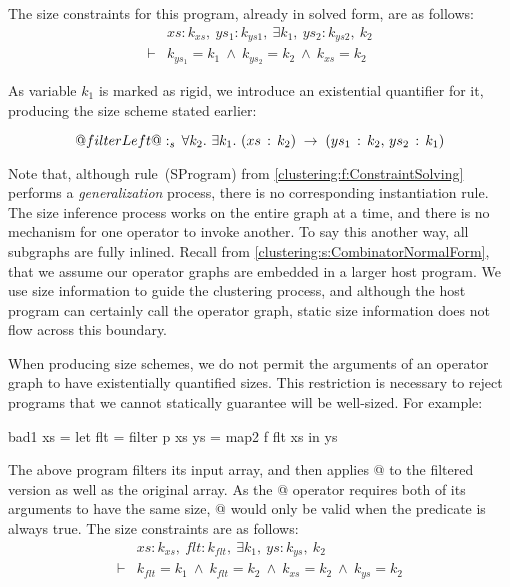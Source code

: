 The size constraints for this program, already in solved form, are as follows:
$$
\begin{array}{ll}
       & xs : k_{xs},~ ys_1 : k_{ys1},~ \exists k_1,~ ys_2 : k_{ys2},~ k_2
\\
\vdash &          k_{ys_1} = k_1
        ~\wedge~  k_{ys_2} = k_2
        ~\wedge~  k_{xs}   = k_2
\end{array}
$$

As variable $k_1$ is marked as rigid, we introduce an existential quantifier for it, producing the size scheme stated earlier:

$$
@filterLeft@ :\sb{s}\,\forall k\sb{2}.\ \exists k\sb{1}.\ (xs\,:\,k\sb{2})\;\to\;(ys\sb{1}\,:\,k\sb{2},\,ys\sb{2}\,:\,k\sb{1})
$$

Note that, although rule~(SProgram) from \cref{clustering:f:ConstraintSolving} performs a \emph{generalization} process, there is no corresponding instantiation rule. The size inference process works on the entire graph at a time, and there is no mechanism for one operator to invoke another. To say this another way, all subgraphs are fully inlined. Recall from \cref{clustering:s:CombinatorNormalForm}, that we assume our operator graphs are embedded in a larger host program. We use size information to guide the clustering process, and although the host program can certainly call the operator graph, static size information does not flow across this boundary.

When producing size schemes, we do not permit the arguments of an operator graph to have existentially quantified sizes.
This restriction is necessary to reject programs that we cannot statically guarantee will be well-sized.
For example:
\begin{haskell}
bad1 xs
 = let flt = filter p xs
       ys  = map2   f flt xs
   in  ys
\end{haskell}

The above program filters its input array, and then applies @ to the filtered version as well as the original array.
As the @ operator requires both of its arguments to have the same size, @ would only be valid when the predicate \Hs@p@ is always true.
The size constraints are as follows:
$$
\begin{array}{ll}
       & xs : k_{xs},~ flt : k_{flt},~ \exists k_1,~ ys : k_{ys},~ k_2
\\
\vdash &          k_{flt}  = k_1
        ~\wedge~  k_{flt}  = k_2
        ~\wedge~  k_{xs}   = k_2
        ~\wedge~  k_{ys}   = k_2
\end{array}
$$

